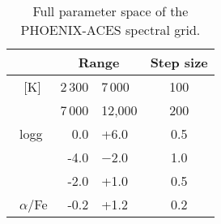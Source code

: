 
\begin{table}
    \centering
    \caption{Full parameter space of the {PHOENIX-ACES} spectral grid.}
    \begin{tabular}{lr@{ -- }lc}    %
        \toprule
        & \multicolumn{2}{c}{Range}       & Step size\\
        \midrule
        \ \teff{} [K] &  2\,300 & 7\,000  & 100 \\
        &  7\,000 & 12,000 & 200 \\ 
        \  logg     &  0.0 & +6.0   & 0.5 \\
        \ \feh{}   &  -4.0 & $-$2.0  & 1.0 \\    %
        &  -2.0 & +1.0  & 0.5 \\
        \  \(\alpha\)/Fe &  -0.2 & +1.2  & 0.2 \\
        \bottomrule
    \end{tabular}
    \label{tab:phoenix}
\end{table}
